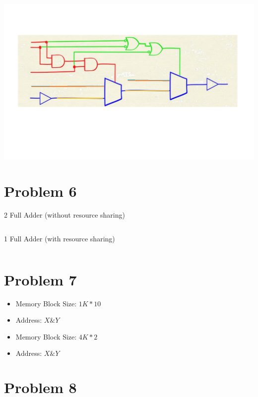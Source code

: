 \documentclass[paper=a4, fontsize=11pt]{scrartcl} %
\numberwithin{equation}{section} %
\numberwithin{figure}{section} %
\numberwithin{table}{section} %
\begin{document}
\center\includegraphics[scale=0.5]{p5-3.png}\\



\section{Problem 6}
\par 2 Full Adder (without resource sharing)
\inputminted{vhdl}{src/p6/p6-1.vhd}
\par 1 Full Adder (with resource sharing)
\inputminted{vhdl}{src/p6/p6-2.vhd}


\section{Problem 7}
\par
\begin{itemize}
	\item Memory Block Size: $1K * 10$
	\item Address: $X \& Y$
\end{itemize}
\par
\begin{itemize}
	\item Memory Block Size: $4K * 2$
	\item Address: $X \& Y$
\end{itemize}


\section{Problem 8}

\inputminted{vhdl}{src/p8/control.vhd}
\inputminted{vhdl}{src/p8/counter.vhd}
\inputminted{vhdl}{src/p8/datapath.vhd}
\inputminted{vhdl}{src/p8/main.vhd}
\inputminted{vhdl}{src/p8/main_t.vhd}
\end{document}
